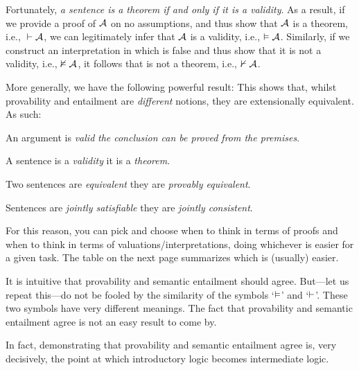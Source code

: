 Fortunately, \emph{a sentence is a theorem if and only if it is a validity}. As a result, if we provide a proof of $\mathcal{A}$ on no assumptions, and thus show that $\mathcal{A}$ is a theorem, i.e., ${}\vdash \mathcal{A}$, we can legitimately infer that $\mathcal{A}$ is a validity, i.e., $\vDash\mathcal{A}$. Similarly, if we construct an interpretation in which  is false and thus show that it is not a validity, i.e., $\nvDash \mathcal{A}$, it follows that  is not a theorem, i.e.,  $\nvdash \mathcal{A}$.

More generally, we have the following powerful result:
This shows that, whilst provability and entailment are \emph{different} notions, they are extensionally equivalent. As such:
	\begin{ebullet}
		\item An argument is \emph{valid} \ifeff{} \emph{the conclusion can be proved from the premises}.
		\item A sentence is a \emph{validity} \ifeff{} it is a \emph{theorem}.
		\item Two sentences are \emph{equivalent} \ifeff{} they are
		\emph{provably equivalent}.
		\item Sentences are \emph{jointly satisfiable} \ifeff{} they are
		\emph{jointly consistent}.
	\end{ebullet}
For this reason, you can pick and choose when to think in terms of proofs and when to think in terms of valuations/interpretations, doing whichever is easier for a given task. The table on the next page summarizes which is (usually) easier.

It is intuitive that provability and semantic entailment should agree. But---let us repeat this---do not be fooled by the similarity of the symbols `$\vDash$' and `$\vdash$'. These two symbols have very different meanings. The fact that provability and semantic entailment agree is not an easy result to come by.

In fact, demonstrating that provability and semantic entailment agree is, very decisively, the point at which introductory logic becomes intermediate logic.

